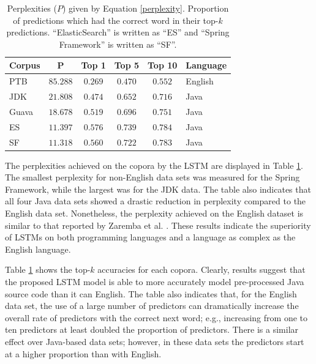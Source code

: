\documentclass[runningheads,a4paper]{llncs}
\newcommand{\tabhorzspacing}{0.5em}
\newcommand{\tabvertspacing}{1.1}
\begin{document}
\begin{table}[t]
    \caption{Perplexities ($P$) given by Equation \ref{perplexity}.
    Proportion of predictions which had the correct
    word in their top-$k$ predictions.
    ``ElasticSearch'' is written as ``ES'' and ``Spring
    Framework'' is written as ``SF''.}
    \label{topk-table}
    \vskip 0.15in
    \begin{center}
    \setlength{\tabcolsep}{\tabhorzspacing}
    {\renewcommand{\arraystretch}{\tabvertspacing}
    \begin{tabular}{lccccl}
    \hline
    Corpus & P & Top 1 & Top 5 & Top 10 & Language \\
    \hline
    PTB   & $85.288$ & $0.269$ & $0.470$ & $0.552$ & English \\
    JDK   & $21.808$ & $0.474$ & $0.652$ & $0.716$ & Java \\
    Guava & $18.678$ & $0.519$ & $0.696$ & $0.751$ & Java \\
    ES    & $11.397$ & $0.576$ & $0.739$ & $0.784$ & Java \\
    SF    & $11.318$ & $0.560$ & $0.722$ & $0.783$ & Java \\
    \hline
    \end{tabular}}
    \end{center}
    \vskip -0.1in
\end{table}

The perplexities achieved on the copora by the LSTM are displayed in
Table \ref{topk-table}. The smallest perplexity for non-English data sets 
was measured for the Spring Framework, while the largest was for the JDK data. 
The table also indicates that all four Java data sets showed a drastic 
reduction in perplexity compared to the English data set. Nonetheless, the 
perplexity achieved on the English dataset is similar to that reported by 
Zaremba et al. \cite{Zaremba}. These results indicate the superiority of LSTMs on both
programming languages and a language as complex as the English language.

Table \ref{topk-table} shows the top-$k$ accuracies for each copora.
Clearly, results suggest that the proposed LSTM model is able to more
accurately model pre-processed Java source code than it can English. The table
also indicates that, for the English data set, the use of a large number of
predictors can dramatically increase the overall rate of predictors with the
correct next word; e.g., increasing from one to ten predictors at least doubled
the proportion of predictors. There is a similar effect over Java-based data
sets; however, in these data sets the predictors start at a higher proportion
than with English.
\end{document}
